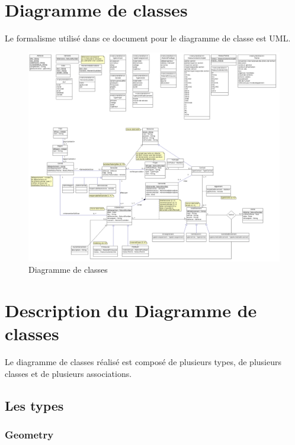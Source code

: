 
\section{Diagramme de classes}

Le formalisme utilisé dans ce document pour le diagramme de classe est UML.

\begin{landscape}
\begin{figure}
	\centering
	\includegraphics[scale=0.3]{images/diagrammeDeClasses.png}
	\caption{\label{modele}Diagramme de classes}
\end{figure}
\end{landscape}

\section{Description du Diagramme de classes}

Le diagramme de classes réalisé est composé de plusieurs types, de plusieurs classes et de plusieurs associations. \\ 

\subsection{Les types}

\subsubsection*{Geometry}

